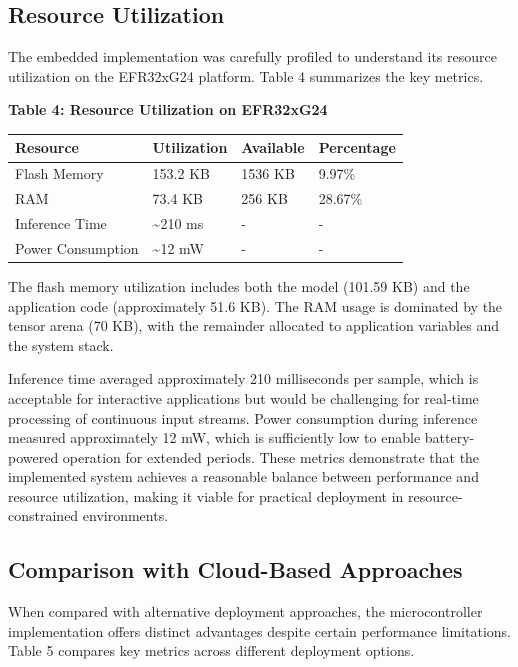 \documentclass[
  9pt,
  letterpaper,
  abstract,
  titlepage]{scrbook}
\begin{document}
\subsection{Resource Utilization}\label{resource-utilization}

The embedded implementation was carefully profiled to understand its
resource utilization on the EFR32xG24 platform. Table 4 summarizes the
key metrics.

\textbf{Table 4: Resource Utilization on EFR32xG24}

\begin{longtable}[]{@{}llll@{}}
\toprule\noalign{}
Resource & Utilization & Available & Percentage \\
\midrule\noalign{}
\endhead
\bottomrule\noalign{}
\endlastfoot
Flash Memory & 153.2 KB & 1536 KB & 9.97\% \\
RAM & 73.4 KB & 256 KB & 28.67\% \\
Inference Time & \textasciitilde210 ms & - & - \\
Power Consumption & \textasciitilde12 mW & - & - \\
\end{longtable}

The flash memory utilization includes both the model (101.59 KB) and the
application code (approximately 51.6 KB). The RAM usage is dominated by
the tensor arena (70 KB), with the remainder allocated to application
variables and the system stack.

Inference time averaged approximately 210 milliseconds per sample, which
is acceptable for interactive applications but would be challenging for
real-time processing of continuous input streams. Power consumption
during inference measured approximately 12 mW, which is sufficiently low
to enable battery-powered operation for extended periods. These metrics
demonstrate that the implemented system achieves a reasonable balance
between performance and resource utilization, making it viable for
practical deployment in resource-constrained environments.

\subsection{Comparison with Cloud-Based
Approaches}\label{comparison-with-cloud-based-approaches}

When compared with alternative deployment approaches, the
microcontroller implementation offers distinct advantages despite
certain performance limitations. Table 5 compares key metrics across
different deployment options.
\end{document}
